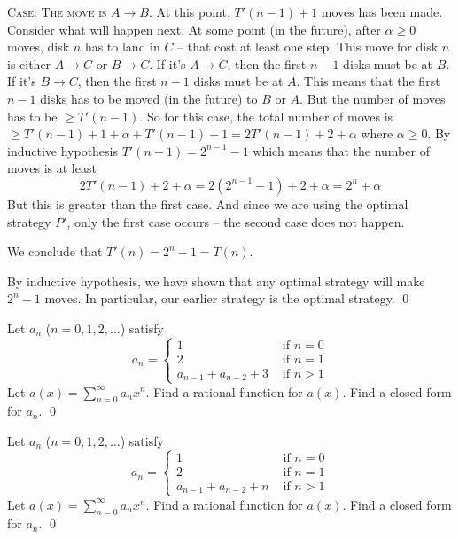 \textsc{Case: The move is $A\rightarrow B$.}
At this point, $T'(n-1) + 1$ moves has been made.
Consider what will happen next.
At some point (in the future), after $\alpha \geq 0$ moves, 
disk $n$ has to land in $C$ -- that cost at least one step.
This move for disk $n$ is either $A \rightarrow C$ or $B \rightarrow C$.
If it's $A \rightarrow C$, then the first $n - 1$ disks must be at $B$.
If it's $B \rightarrow C$, then the first $n - 1$ disks must be at $A$.
This means that the first $n - 1$ disks has to be moved (in the future)
to $B$ or $A$.
But the number of moves has to be $\geq T'(n-1)$.
So for this case, the total number of moves is
$\geq T'(n-1) + 1 + \alpha + T'(n-1) + 1 = 2T'(n-1) + 2 + \alpha$ where
$\alpha \geq 0$.
By inductive hypothesis $T'(n-1) = 2^{n-1} - 1$ which means that 
the number of moves is at least
\[
2T'(n - 1) + 2 + \alpha = 2(2^{n-1} - 1) + 2 + \alpha = 2^n + \alpha
\]
But this is greater than the first case.
And since we are using the optimal strategy $P'$, only the first case occurs
-- the second case does
not happen.

We conclude that $T'(n) = 2^n - 1 = T(n)$.

By inductive hypothesis, we have shown that any optimal strategy will
make $2^n - 1$ moves.
In particular, our earlier strategy is the optimal strategy.
\qed


\newpage{}


\newpage
\begin{ex}
Let $a_n$ ($n=0, 1, 2, \ldots$) satisfy
\[
a_n = 
\begin{cases}
1 &\text{ if } n = 0 \\
2 &\text{ if } n = 1 \\
a_{n-1} + a_{n-2} + 3 &\text{ if } n > 1
\end{cases}
\]
Let $a(x) = \sum_{n=0}^\infty a_n x^n$.
Find a rational function for $a(x)$.
Find a closed form for $a_n$.
\qed
\end{ex}


\newpage
\begin{ex}
Let $a_n$ ($n=0, 1, 2, \ldots$) satisfy
\[
a_n = 
\begin{cases}
1 &\text{ if } n = 0 \\
2 &\text{ if } n = 1 \\
a_{n-1} + a_{n-2} + n &\text{ if } n > 1
\end{cases}
\]
Let $a(x) = \sum_{n=0}^\infty a_n x^n$.
Find a rational function for $a(x)$.
Find a closed form for $a_n$.
\qed
\end{ex}


